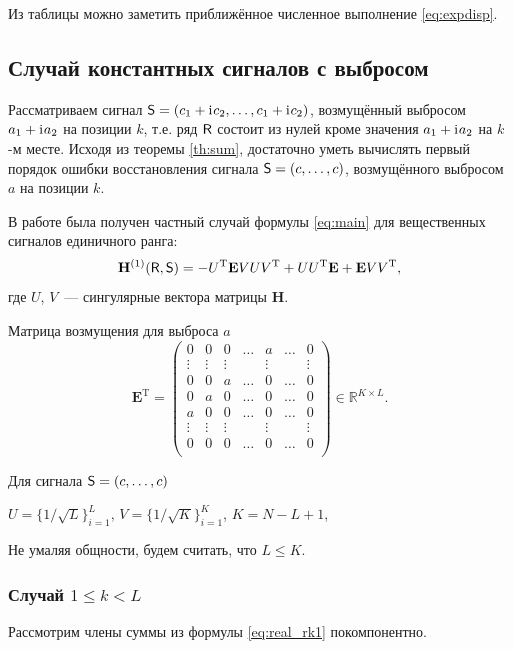 \documentclass[specialist,
               substylefile = spbu.rtx,
               subf,href,colorlinks=true, 12pt]{disser}
\begin{document}
Из таблицы можно заметить приближённое численное выполнение \eqref{eq:expdisp}.

\subsection{Случай константных сигналов с выбросом}
Рассматриваем сигнал $\textsf{S} = (c_1 + \mathrm{i}\mkern1mu c_2, \ldots, c_1 + \mathrm{i}\mkern1mu c_2)$, возмущённый выбросом $a_1 + \mathrm{i}\mkern1mu a_2$ на позиции $k$, т.е. ряд $\textsf{R}$ состоит из нулей кроме значения $a_1 + \mathrm{i}\mkern1mu a_2$ на $k$-м месте. Исходя из теоремы \ref{th:sum}, достаточно уметь вычислять первый порядок ошибки восстановления сигнала $\textsf{S} = (c, \ldots, c)$, возмущённого выбросом $a$ на позиции $k$.

В работе \cite{Nekr2008} была получен частный случай формулы \eqref{eq:main} для вещественных сигналов единичного ранга:
\begin{equation} \label{eq:real_rk1}
\mathbf{H}^{(1)}(\textsf{R}, \textsf{S}) = -U^{\mathrm{T}} \mathbf{E} V U V^{\mathrm{T}} + U U^{\mathrm{T}} \mathbf{E} + \mathbf{E} V V^{\mathrm{T}},
\end{equation}
где $U$, $V$~--- сингулярные вектора матрицы $\mathbf{H}$.

Матрица возмущения для выброса $a$
$$\mathbf{E}^{\mathrm{T}} = \begin{pmatrix}
	0 & 0 & 0 & \ldots &  a  & \ldots & 0\\
	 \vdots &\vdots & \vdots & &  \vdots & & \vdots\\
	0 & 0 & a & \ldots & 0 & \ldots & 0\\
	0 & a & 0 & \ldots & 0 & \ldots & 0\\
	a & 0 & 0 & \ldots & 0 & \ldots & 0\\
	\vdots &\vdots & \vdots & & \vdots & & \vdots\\
	0 & 0 & 0 & \ldots & 0 & \ldots & 0\\
\end{pmatrix} \in \mathbb{R}^{K \times L}.$$

Для сигнала $\textsf{S} = (c, \ldots, c)$

$U = \{1/\sqrt{L}\}^{L}_{i = 1},\, V = \{1/\sqrt{K}\}^{K}_{i = 1}$, $K = N - L + 1$, 

Не умаляя общности, будем считать, что $L \leq K$.

\subsubsection{Случай $1 \leq k < L$}

Рассмотрим члены суммы из формулы \eqref{eq:real_rk1} покомпонентно.
\end{document}
